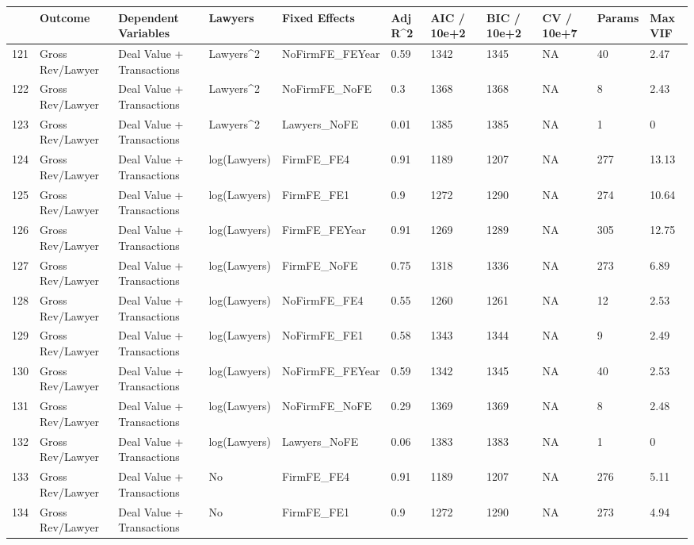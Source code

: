 \documentclass{article}
\begin{document}
\begin{table}[H]
\centering
\begin{tabular}{rllllllllll}
  \hline
 & Outcome & Dependent Variables & Lawyers & Fixed Effects & Adj R^2 & AIC / 10e+2 & BIC / 10e+2 & CV / 10e+7 & Params & Max VIF \\ 
  \hline
121 & Gross Rev/Lawyer & Deal Value + Transactions & Lawyers^2 & NoFirmFE\_FEYear & 0.59 & 1342 & 1345 & NA & 40 & 2.47 \\ 
  122 & Gross Rev/Lawyer & Deal Value + Transactions & Lawyers^2 & NoFirmFE\_NoFE & 0.3 & 1368 & 1368 & NA & 8 & 2.43 \\ 
  123 & Gross Rev/Lawyer & Deal Value + Transactions & Lawyers^2 & Lawyers\_NoFE & 0.01 & 1385 & 1385 & NA & 1 & 0 \\ 
  124 & Gross Rev/Lawyer & Deal Value + Transactions & log(Lawyers) & FirmFE\_FE4 & 0.91 & 1189 & 1207 & NA & 277 & 13.13 \\ 
  125 & Gross Rev/Lawyer & Deal Value + Transactions & log(Lawyers) & FirmFE\_FE1 & 0.9 & 1272 & 1290 & NA & 274 & 10.64 \\ 
  126 & Gross Rev/Lawyer & Deal Value + Transactions & log(Lawyers) & FirmFE\_FEYear & 0.91 & 1269 & 1289 & NA & 305 & 12.75 \\ 
  127 & Gross Rev/Lawyer & Deal Value + Transactions & log(Lawyers) & FirmFE\_NoFE & 0.75 & 1318 & 1336 & NA & 273 & 6.89 \\ 
  128 & Gross Rev/Lawyer & Deal Value + Transactions & log(Lawyers) & NoFirmFE\_FE4 & 0.55 & 1260 & 1261 & NA & 12 & 2.53 \\ 
  129 & Gross Rev/Lawyer & Deal Value + Transactions & log(Lawyers) & NoFirmFE\_FE1 & 0.58 & 1343 & 1344 & NA & 9 & 2.49 \\ 
  130 & Gross Rev/Lawyer & Deal Value + Transactions & log(Lawyers) & NoFirmFE\_FEYear & 0.59 & 1342 & 1345 & NA & 40 & 2.53 \\ 
  131 & Gross Rev/Lawyer & Deal Value + Transactions & log(Lawyers) & NoFirmFE\_NoFE & 0.29 & 1369 & 1369 & NA & 8 & 2.48 \\ 
  132 & Gross Rev/Lawyer & Deal Value + Transactions & log(Lawyers) & Lawyers\_NoFE & 0.06 & 1383 & 1383 & NA & 1 & 0 \\ 
  133 & Gross Rev/Lawyer & Deal Value + Transactions & No & FirmFE\_FE4 & 0.91 & 1189 & 1207 & NA & 276 & 5.11 \\ 
  134 & Gross Rev/Lawyer & Deal Value + Transactions & No & FirmFE\_FE1 & 0.9 & 1272 & 1290 & NA & 273 & 4.94 \\ 

\end{tabular}
\end{table}
\end{document}
